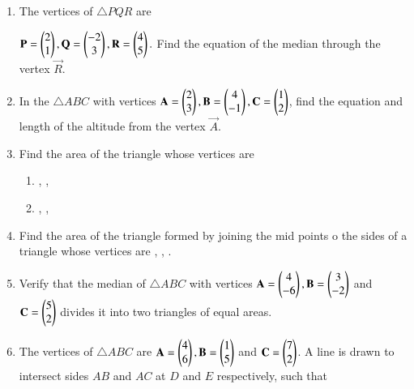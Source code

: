 \renewcommand{\theequation}{\theenumi}
\begin{enumerate}[label=\arabic*.,ref=\thesubsection.\theenumi]
\item The vertices of $\triangle PQR$ are 

$
\mathbf{P} = \begin{pmatrix}2 \\1\end{pmatrix},
\mathbf{Q} = \begin{pmatrix}-2\\3\end{pmatrix},
\mathbf{R} = \begin{pmatrix}4\\5\end{pmatrix}.
$
Find the equation of the median through the vertex $\vec{R}$.
\item In the $\triangle ABC$ with vertices
$
\mathbf{A}=\begin{pmatrix}2\\3\end{pmatrix}, 
\mathbf{B}=\begin{pmatrix}4\\-1\end{pmatrix},
 \mathbf{C}=\begin{pmatrix}1\\2\end{pmatrix}
$,
find the equation and length of the altitude from the vertex $\vec{A}$.
\item Find the area of the triangle whose vertices are
\begin{enumerate}
\item {}, ,  
\item  {},  ,  
\end{enumerate}
\item Find the area of the triangle formed by joining the mid points o the sides of a triangle whose vertices are  ,  ,  .
\item Verify that the median of $\triangle ABC$ with vertices $\mathbf{A}=\begin{pmatrix}4\\-6\end{pmatrix},  \mathbf{B}=\begin{pmatrix}3\\-2\end{pmatrix}$ and  $\mathbf{C} =  \begin{pmatrix}5\\2\end{pmatrix}$ divides it into two triangles of equal areas.
\item The vertices of $\triangle ABC$ are $\mathbf{A}=\begin{pmatrix}4\\6\end{pmatrix},  \mathbf{B}=\begin{pmatrix}1\\5\end{pmatrix}$ and  $\mathbf{C} =  \begin{pmatrix}7\\2\end{pmatrix}$.  A line is drawn to intersect sides $AB$ and $AC$ at $D$ and $E$ respectively, such that
\begin{align}

\end{align}
\end{enumerate}
